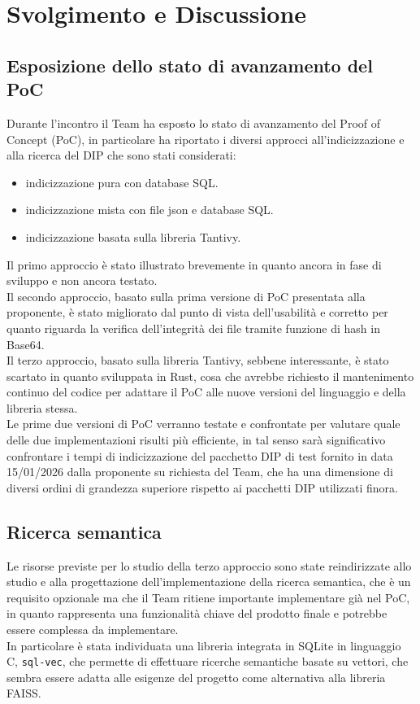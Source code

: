 \documentclass[a4paper,12pt]{article}
\begin{document}
\section{Svolgimento e Discussione}

\subsection{Esposizione dello stato di avanzamento del PoC}

Durante l'incontro il Team ha esposto lo stato di avanzamento del Proof of Concept (PoC), in particolare ha riportato i diversi approcci all'indicizzazione e alla ricerca del DIP che sono stati considerati:
\begin{itemize}
    \item indicizzazione pura con database SQL.
    \item indicizzazione mista con file json e database SQL.
    \item indicizzazione basata sulla libreria Tantivy.
\end{itemize}

Il primo approccio è stato illustrato brevemente in quanto ancora in fase di sviluppo e non ancora testato.\\

Il secondo approccio, basato sulla prima versione di PoC presentata alla proponente, è stato migliorato dal punto di vista dell'usabilità e corretto per quanto riguarda la verifica dell'integrità dei file tramite funzione di hash in Base64.\\

Il terzo approccio, basato sulla libreria Tantivy, sebbene interessante, è stato scartato in quanto sviluppata in Rust, cosa che avrebbe richiesto il mantenimento continuo del codice per adattare il PoC alle nuove versioni del linguaggio e della libreria stessa.\\

Le prime due versioni di PoC verranno testate e confrontate per valutare quale delle due implementazioni risulti più efficiente, in tal senso sarà significativo confrontare i tempi di indicizzazione del pacchetto DIP di test fornito in data 15/01/2026 dalla proponente su richiesta del Team, che ha una dimensione di diversi ordini di grandezza superiore rispetto ai pacchetti DIP utilizzati finora.

\subsection{Ricerca semantica}
Le risorse previste per lo studio della terzo approccio sono state reindirizzate allo studio e alla progettazione dell'implementazione della ricerca semantica, che è un requisito opzionale ma che il Team ritiene importante implementare già nel PoC, in quanto rappresenta una funzionalità chiave del prodotto finale e potrebbe essere complessa da implementare.\\
In particolare è stata individuata una libreria integrata in SQLite in linguaggio C, \texttt{sql-vec}, che permette di effettuare ricerche semantiche basate su vettori, che sembra essere adatta alle esigenze del progetto come alternativa alla libreria FAISS.\\
\end{document}
